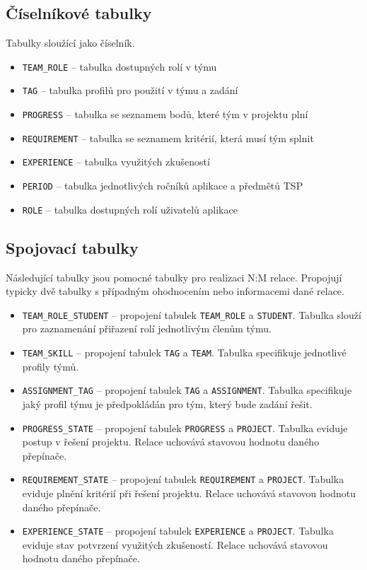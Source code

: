\documentclass[czech,BP]{thesiskiv}
\begin{document}
		\subsection{Číselníkové tabulky}
		\par Tabulky sloužící jako číselník.
		\begin{itemize}
			\item \texttt{TEAM\_ROLE} -- tabulka dostupných rolí v týmu
			\item \texttt{TAG} -- tabulka profilů pro použití v týmu a zadání
			\item \texttt{PROGRESS} -- tabulka se seznamem bodů, které tým v projektu plní
			\item \texttt{REQUIREMENT} -- tabulka se seznamem kritérií, která musí tým splnit
			\item \texttt{EXPERIENCE} -- tabulka využitých zkušeností
			\item \texttt{PERIOD} -- tabulka jednotlivých ročníků aplikace a předmětů TSP
			\item \texttt{ROLE} -- tabulka dostupných rolí uživatelů aplikace
		\end{itemize}
		\subsection{Spojovací tabulky}
			\par Následující tabulky jsou pomocné tabulky pro realizaci N:M relace. Propojují typicky dvě tabulky s případným ohodnocením nebo informacemi dané relace.
			\begin{itemize}
				\item \texttt{TEAM\_ROLE\_STUDENT} -- propojení tabulek \texttt{TEAM\_ROLE} a \texttt{STUDENT}. Tabulka slouží pro zaznamenání přiřazení rolí jednotlivým členům týmu.
				\item \texttt{TEAM\_SKILL} -- propojení tabulek \texttt{TAG} a \texttt{TEAM}. Tabulka specifikuje jednotlivé profily týmů.
				\item \texttt{ASSIGNMENT\_TAG} -- propojení tabulek \texttt{TAG} a \texttt{ASSIGNMENT}. Tabulka specifikuje jaký profil týmu je předpokládán pro tým, který bude zadání řešit.
				\item \texttt{PROGRESS\_STATE} -- propojení tabulek \texttt{PROGRESS} a \texttt{PROJECT}. Tabulka eviduje postup v řešení projektu. Relace uchovává stavovou hodnotu daného přepínače.
				\item \texttt{REQUIREMENT\_STATE} -- propojení tabulek \texttt{REQUIREMENT} a \texttt{PROJECT}. Tabulka eviduje plnění kritérií při řešení projektu. Relace uchovává stavovou hodnotu daného přepínače.
				\item \texttt{EXPERIENCE\_STATE} -- propojení tabulek \texttt{EXPERIENCE} a \texttt{PROJECT}. Tabulka eviduje stav potvrzení využitých zkušeností. Relace uchovává stavovou hodnotu daného přepínače.
			\end{itemize}
\end{document}
